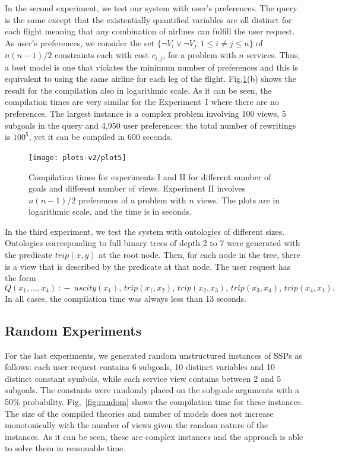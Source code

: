 \documentclass{llncs}
\newcommand{\qrule}{:\!\!-}
\newcommand{\trip}{\textit{trip}}
\newcommand{\UScity}{\textit{uscity}}
\begin{document}
In the second experiment, we test our system with user's preferences.
The query is the same except that the existentially quantified variables
are all distinct for each flight meaning that any combination of airlines
can fulfill the user request.
As user's preferences, we consider the set
$\{\neg V_i \lor \neg V_j : 1\leq i\neq j\leq n\}$ of $n(n-1)/2$ constraints
each with cost $c_{i,j}$, for a problem with $n$ services.
Thus, a best model is one that violates the minimum number of preferences
and this is equivalent to using the same airline
for each leg of the flight. Fig.\ref{fig:plot1}(b) shows the result for
the compilation also in logarithmic scale.
As it can be seen,  the compilation times are very similar for the
Experiment~I where there are no preferences.
The largest instance is a complex problem involving 100 views, 5 subgoals
in the query and 4,950 user preferences; the total number of rewritings
is $100^5$, yet it can be compiled in 600 seconds.

\begin{figure}[t]
\centering
\texttt{[image: plots-v2/plot5]}
\caption{Compilation times for experiments I and II for different
number of goals and different number of views.
Experiment II involves $n(n-1)/2$ preferences of a problem with $n$ views.
The plots are in logarithmic scale, and the time is in seconds.}
\label{fig:plot1}
\end{figure}

In the third experiment, we test the system with ontologies of different sizes.
Ontologies corresponding to full binary trees of depth 2 to 7 were generated with
the predicate $\trip(x,y)$ at the root node. Then, for each node in the tree,
there is a view that is described by the predicate at that node.
The user request has the form
\[ Q(x_1,\ldots,x_4)\ \qrule\  \UScity(x_1),\,\trip(x_1,x_2),\,\trip(x_2,x_3),\,\trip(x_3,x_4),\,\trip(x_4,x_1).\]
In all cases, the compilation time was always less than 13 seconds.

\subsection{Random Experiments}

For the last experiments, we generated random unstructured instances of SSPs
as follows: each user request contains 6 subgoals, 10 distinct variables and
10 distinct constant symbols, while each service view contains between 2 and
5 subgoals. The constants were randomly placed on the subgoals arguments with
a 50\% probability.
Fig,~\ref{fig:random} shows the compilation time for these instances. 
The size of the compiled theories and number of models does not increase
monotonically with the number of views given the random nature of the
instances. As it can be seen, these are complex instances and the approach
is able to solve them in reasonable time.
\end{document}
